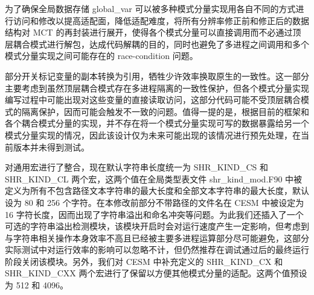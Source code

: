 为了确保全局数据存储 global\_var 可以被多种模式分量实现用各自不同的方式进行访问和修改以提高适配面，降低适配难度，将所有分辨率修正前和修正后的数据结构对 MCT 的再封装进行展开，使得各个模式分量可以直接调用而不必通过顶层耦合模式进行解包，达成代码解耦的目的，同时也避免了多进程之间调用和多个模式分量实现之间可能存在的 race-condition 问题。

部分开关标记变量的副本转换为引用，牺牲少许效率换取原生的一致性。这一部分主要考虑到虽然顶层耦合模式存在多进程隔离的一致性保护，但各个模式分量实现编写过程中可能出现对这些变量的直接读取访问，这部分代码可能不受顶层耦合模式的隔离保护，因而可能会触发不一致的问题。值得一提的是，根据目前的框架和各个耦合模式分量的实现，并不存在将一个模式分量实现可写的数据暴露给另一个模式分量实现的情况，因此该设计仅为未来可能出现的该情况进行预先处理，在当前版本并未得到测试。

对通用宏进行了整合，现在默认字符串长度统一为 SHR\_KIND\_CS 和 SHR\_KIND\_CL 两个宏，这两个值在全局类型表文件 shr\_kind\_mod.F90 中被定义为所有不包含路径文本字符串的最大长度和全部文本字符串的最大长度，默认设为 80 和 256 个字符。在本修改前部分不带路径的文件名在 CESM 中被设定为 16 字符长度，因而出现了字符串溢出和命名冲突等问题。为此我们还插入了一个可选的字符串溢出检测模块，该模块开启时会对运行速度产生一定影响，但考虑到与字符串相关操作本身效率不高且已经被主要多进程运算部分尽可能避免，这部分实际测试中对运行效率的影响可以忽略不计，但仍然推荐在调试通过后的最终运行阶段关闭该模块。另外，我们对 CESM 中补充定义的 SHR\_KIND\_CX 和 SHR\_KIND\_CXX 两个宏进行了保留以方便其他模式分量的适配。这两个值预设为 512 和 4096。


